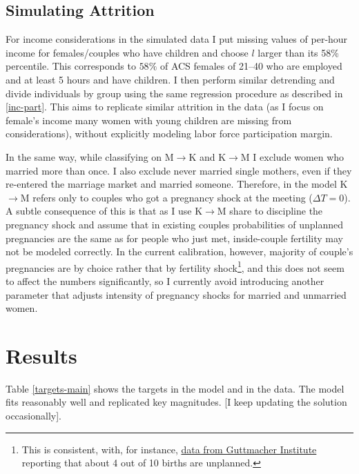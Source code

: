 \documentclass[12pt,letter]{article}
\begin{document}
\subsection{Simulating Attrition\label{income-attr}}
For income considerations in the simulated data I put missing values of per-hour income for females/couples who have children and choose $l$ larger than its 58\% percentile. This corresponds to $58\%$ of ACS females of 21--40 who are employed and at least 5 hours and have children. I then perform similar detrending and divide individuals by group using the same regression procedure as described in \ref{inc-part}. This aims to replicate similar attrition in the data (as I focus on female's income many women with young children are missing from considerations), without explicitly modeling labor force participation margin.

In the same way, while classifying on M$\to$K and K$\to$M I exclude women who married more than once. I also exclude never married single mothers, even if they re-entered the marriage market and married someone. Therefore, in the model K$\to$M refers only to couples who got a pregnancy shock at the meeting ($\Delta T = 0$). A subtle consequence of this is that as I use K$\to$M share to discipline the pregnancy shock and assume that in existing couples probabilities of unplanned pregnancies are the same as for people who just met, inside-couple fertility may not be modeled correctly. In the current calibration, however, majority of couple's pregnancies are by choice rather that by fertility shock\footnote{This is consistent, with, for instance, \href{https://www.guttmacher.org/fact-sheet/unintended-pregnancy-united-states}{data from Guttmacher Institute} reporting that about 4 out of 10 births are unplanned.}, and this does not seem to affect the numbers significantly, so I currently avoid introducing another parameter that adjusts intensity of pregnancy shocks for married and unmarried women.

\section{Results}
Table \ref{targets-main} shows the targets in the model and in the data. The model fits reasonably well and replicated key magnitudes. [I keep updating the solution occasionally].
\end{document}
